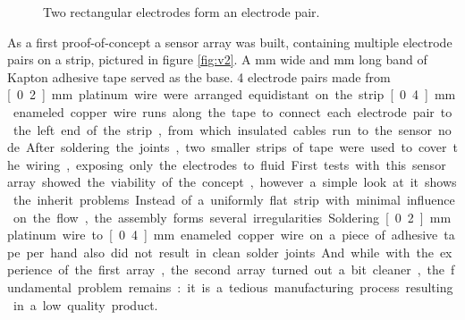 \begin{figure}[H]
	\begin{center}
		\caption{Two rectangular electrodes form an electrode pair.}
		\label{fig:sensor}
	\end{center}
\end{figure}

As a first proof-of-concept a sensor array was built, containing multiple electrode pairs on a strip, pictured in figure \ref{fig:v2}. A \unit[50]{mm} wide and \unit[250]{mm} long band of Kapton adhesive tape served as the base. 4 electrode pairs made from \unit[0.2]{mm} platinum wire were arranged equidistant on the strip. \unit[0.4]{mm} enameled copper wire runs along the tape to connect each electrode pair to the left end of the strip, from which insulated cables run to the sensor node. After soldering the joints, two smaller strips of tape were used to cover the wiring, exposing only the electrodes to fluid.

First tests with this sensor array showed the viability of the concept, however a simple look at it shows the inherit problems. Instead of a uniformly flat strip with minimal influence on the flow, the assembly forms several irregularities. Soldering \unit[0.2]{mm} platinum wire to \unit[0.4]{mm} enameled copper wire on a piece of adhesive tape per hand also did not result in clean solder joints. And while with the experience of the first array, the second array turned out a bit cleaner, the fundamental problem remains: it is a tedious manufacturing process resulting in a low quality product.

